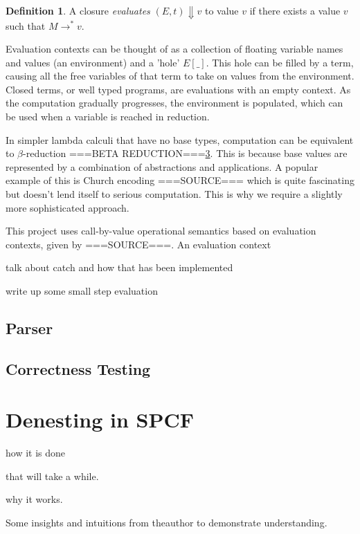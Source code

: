 \documentclass[12pt,a4paper]{report}
\theoremstyle{definition}
\newtheorem{definition}{Definition}[section]
\theoremstyle{remark}
\begin{document}
\begin{definition}
    A closure \emph{evaluates} $(E, t) \Downarrow v$ to value $v$ if there exists a value $v$ such that $M \rightarrow^* v$.
\end{definition}

Evaluation contexts can be thought of as a collection of floating variable names and values (an environment) and a 'hole' $E[\_]$. This hole can be filled by a term, causing all the free variables of that term to take on values from the environment. Closed terms, or well typed programs, are evaluations with an empty context. As the computation gradually progresses, the environment is populated, which can be used when a variable is reached in reduction.

In simpler lambda calculi that have no base types, computation can be equivalent to $\beta$-reduction ===BETA REDUCTION===\ref{}. This is because base values are represented by a combination of abstractions and applications. A popular example of this is Church encoding ===SOURCE=== which is quite fascinating but doesn't lend itself to serious computation. This is why we require a slightly more sophisticated approach. 

This project uses call-by-value operational semantics based on evaluation contexts, given by ===SOURCE===. An evaluation context

talk about catch and how that has been implemented

write up some small step evaluation

\section{Parser}

\section{Correctness Testing}

\chapter{Denesting in SPCF}

how it is done 

that will take a while.

why it works.

Some insights and intuitions from theauthor to demonstrate understanding.
\end{document}

